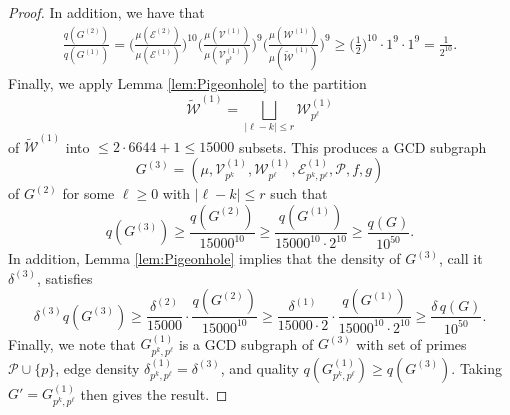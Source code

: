 \documentclass[12pt]{amsart}
\numberwithin{equation}{section}
\theoremstyle{definition}
\theoremstyle{remark}
\newcommand{\CE}{\mathcal{E}}
\newcommand{\CP}{\mathcal{P}}
\newcommand{\CV}{\mathcal{V}}
\newcommand{\CW}{\mathcal{W}}
\renewcommand{\tilde}{\widetilde}
\renewcommand{\le}{\leqslant}
\renewcommand{\ge}{\geqslant}
\begin{document}
\begin{proof}
In addition, we have that
\begin{align*}
\frac{q(G^{(2)})}{q(G^{(1)})}
=\bigg(\frac{\mu(\CE^{(2)})}{\mu(\CE^{(1)})}\bigg)^{10}
\bigg(\frac{\mu(\CV^{(1)})}{\mu(\CV_{p^k}^{(1)})}\bigg)^9
\bigg( \frac{\mu(\CW^{(1)})}{\mu(\tilde{\CW}^{(1)})}\bigg)^9
\ge\bigg(\frac{1}{2}\bigg)^{10}\cdot 1^9\cdot 1^9=\frac{1}{2^{10}}.
\end{align*}
Finally, we apply Lemma \ref{lem:Pigeonhole} to the partition 
\[
\tilde{\CW}^{(1)}=\bigsqcup_{|\ell-k|\le r}\CW^{(1)}_{p^\ell}
\]
of $\tilde{\CW}^{(1)}$ into $\le 2\cdot 6644+1\le 15000$ subsets. This produces a GCD subgraph
\[
G^{(3)}=(\mu,\CV^{(1)}_{p^k},\CW^{(1)}_{p^\ell},\CE^{(1)}_{p^k,p^\ell},\CP,f,g)
\]
of $G^{(2)}$ for some $\ell\ge 0$ with $|\ell-k|\le r$ such that
\[
q(G^{(3)})\ge \frac{q(G^{(2)})}{15000^{10} }\ge \frac{q(G^{(1)})}{15000^{10}\cdot 2^{10}}\ge \frac{q(G)}{10^{50}}.
\]
In addition, Lemma \ref{lem:Pigeonhole} implies that the density of $G^{(3)}$, call it $\delta^{(3)}$, satisfies
\[
\delta^{(3)}q(G^{(3)})\ge \frac{\delta^{(2)}}{15000}\cdot \frac{q(G^{(2)})}{15000^{10}}
	\ge \frac{\delta^{(1)}}{15000\cdot 2}\cdot \frac{q(G^{(1)})}{15000^{10}\cdot 2^{10}}\ge \frac{\delta\,q(G)}{10^{50}}.
\]
Finally, we note that $G^{(1)}_{p^k,p^\ell}$ is a GCD subgraph of $G^{(3)}$ with set of primes $\CP\cup\{p\}$, edge density $\delta^{(1)}_{p^k,p^\ell}=\delta^{(3)}$, and quality $q(G^{(1)}_{p^k,p^\ell})\ge q(G^{(3)})$. Taking $G'=G^{(1)}_{p^k,p^\ell}$ then gives the result.
\end{proof}
\end{document}
